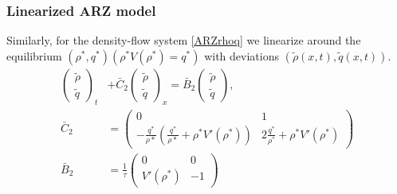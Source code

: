 \documentclass[letterpaper, 10 pt, conference]{ieeeconf}  %
\begin{document}
\subsubsection{Linearized ARZ model}
Similarly, for the density-flow system \eqref{ARZrhoq} we linearize around the equilibrium $(\rho^*, q^*)(\rho^*V(\rho^*) = q^*)$ with deviations $(\tilde{\rho}(x,t), \tilde{q}(x,t))$.
{\footnotesize
\begin{align}
\label{eq:rhoqlin}
\begin{pmatrix}
	\tilde{\rho} \\
	\tilde{q}
\end{pmatrix}_t
&+ \bar{C}_2
\begin{pmatrix}
	\tilde{\rho} \\ 
	\tilde{q}
\end{pmatrix}_x 
= 
\bar{B}_2
\begin{pmatrix}
	\tilde{\rho} \\
	\tilde{q}
\end{pmatrix}, \\
\bar{C}_2 &=
\begin{pmatrix}
	0 & 1 \\
	-\frac{q^{*}}{\rho{*}} \left(
		\frac{q^{*}}{\rho{*}} + \rho^{*} V'\left( \rho^{*} \right) \right) & 2 \frac{q^{*}}{\rho^{*}} + \rho^{*} V'\left( \rho^{*} \right)
\end{pmatrix} \\
\bar{B}_2 &=
\frac{1}{\tau}
\begin{pmatrix}
	0 & 0 \\
	V'\left( \rho^{*} \right) & -1
\end{pmatrix}
\end{align}
}
\end{document}
